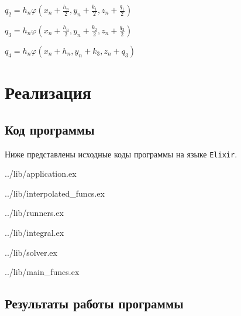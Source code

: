 $q_2 = h_n \varphi(x_n + \frac{h_n}{2}, y_n + \frac{k_1}{2}, z_n + \frac{q_1}{2})$

$q_3 = h_n \varphi(x_n + \frac{h_n}{2}, y_n + \frac{k_2}{2}, z_n + \frac{q_2}{2})$

$q_4 = h_n \varphi(x_n + h_n, y_n + k_3, z_n + q_3)$

\chapter{Реализация}

\section{Код программы}

Ниже представлены исходные коды программы на языке \texttt{Elixir}.

\begin{lstinputlisting}[
        caption={Основной модуль приложения},
        style={mystyle},
    ]{../lib/application.ex}
\end{lstinputlisting}

\begin{lstinputlisting}[
        caption={Модуль с интерполяционными функциями},
        style={mystyle},
    ]{../lib/interpolated_funcs.ex}
\end{lstinputlisting}

\begin{lstinputlisting}[
        caption={Модуль с функциями прогонки с разными параметрами},
        style={mystyle},
    ]{../lib/runners.ex}
\end{lstinputlisting}

\begin{lstinputlisting}[
        caption={Модуль с методами численного интегрирования},
        style={mystyle},
    ]{../lib/integral.ex}
\end{lstinputlisting}

\begin{lstinputlisting}[
        caption={Модуль с генераций искомых значений},
        style={mystyle},
    ]{../lib/solver.ex}
\end{lstinputlisting}

\begin{lstinputlisting}[
        caption={Модуль с функциями тока и напряжения},
        style={mystyle},
    ]{../lib/main_funcs.ex}
\end{lstinputlisting}

\section{Результаты работы программы}

